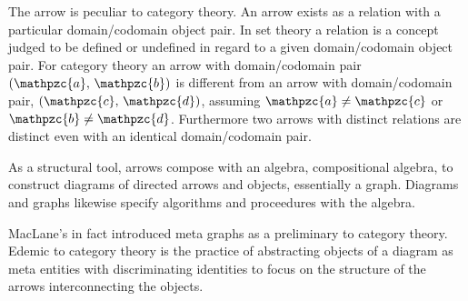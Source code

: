 \documentclass[aps,twocolumn,secnumarabic,nobalancelastpage,amsmath,amssymb,
amsthm,nofootinbib,parskip=full]{revtex4}
\numberwithin{equation}{section}
\newcommand{\obk}[1]{\mathpzc{#1}}
\newcommand{\cpair}[2]{(\obk{#1},\,\obk{#2})}
\begin{document}
The arrow is peculiar to category theory. An arrow exists as a relation
with a particular domain/codomain object pair.
In set theory a relation is a concept judged to be defined or undefined
in regard to a given domain/codomain object pair.
For category theory an arrow with domain/codomain pair $\cpair{a}{b}$
is different from an arrow with domain/codomain pair, $\cpair{c}{d}$,
assuming $\obk{a}\neq\obk{c}$ or $\obk{b}\neq\obk{d}$.
Furthermore two arrows with distinct relations are distinct even with an
identical domain/codomain pair.

As a structural tool, arrows compose with an algebra, compositional algebra,
to construct diagrams of directed arrows and objects, essentially a graph.
Diagrams and graphs likewise specify algorithms and
proceedures with the algebra.

MacLane's in fact introduced meta graphs as a preliminary to category theory.
Edemic to category theory is the practice of abstracting objects of
a diagram as meta entities with discriminating identities to focus on the
structure of the arrows interconnecting the objects.
\end{document}
